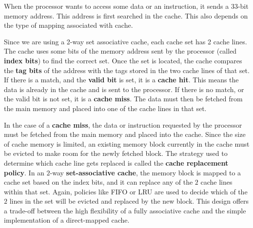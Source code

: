 \documentclass[12pt]{book}
\begin{document}
\begin{example}
When the processor wants to access some data or an instruction, it sends a 33-bit memory address. This address is first searched in the cache. This also depends on the type of mapping associated with cache.

Since we are using a 2-way set associative cache, each cache set has 2 cache lines. The cache uses some bits of the memory address sent by the processor (called \textbf{index bits}) to find the correct set. Once the set is located, the cache compares the \textbf{tag bits} of the address with the tags stored in the two cache lines of that set. If there is a match, and the \textbf{valid bit} is set, it is a \textbf{cache hit}. This means the data is already in the cache and is sent to the processor. If there is no match, or the valid bit is not set, it is a \textbf{cache miss}. The data must then be fetched from the main memory and placed into one of the cache lines in that set.

In the case of a \textbf{cache miss}, the data or instruction requested by the processor must be fetched from the main memory and placed into the cache. Since the size of cache memory is limited, an existing memory block currently in the cache must be evicted to make room for the newly fetched block. The strategy used to determine which cache line gets replaced is called the \textbf{cache replacement policy}. In an $2$-way \textbf{set-associative cache}, the memory block is mapped to a cache set based on the index bits, and it can replace any of the $2$ cache lines within that set. Again, policies like FIFO or LRU are used to decide which of the $2$ lines in the set will be evicted and replaced by the new block. This design offers a trade-off between the high flexibility of a fully associative cache and the simple implementation of a direct-mapped cache.
\end{example}
\end{document}
